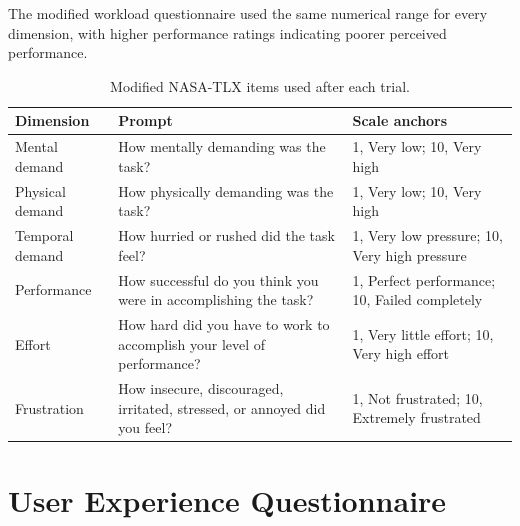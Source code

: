 \documentclass[
english,                 %
bibtex,                  %
includeExtraAbstracts, %
]{kththesis}
\newenvironment{evidenceblock}{\par\addvspace{6pt}\noindent\begin{minipage}{\linewidth}}{\end{minipage}\par\addvspace{6pt}}
\numberwithin{listing}{chapter}
\begin{document}
\begingroup
\scriptsize
\begin{evidenceblock}
\normalsize
The modified workload questionnaire used the same numerical range for every dimension, with higher performance ratings indicating poorer perceived performance.

\begin{table}[H]
\centering
\scriptsize
\caption[Modified NASA-TLX items]{Modified NASA-TLX items used after each trial.}\label{tab:app-nasa-items}
\begin{tabularx}{\linewidth}{L{0.20\textwidth}L{0.45\textwidth}L{0.25\textwidth}}
\toprule
Dimension & Prompt & Scale anchors \\ \midrule

Mental demand & How mentally demanding was the task? & 1, Very low; 10, Very high \\
Physical demand & How physically demanding was the task? & 1, Very low; 10, Very high \\
Temporal demand & How hurried or rushed did the task feel? & 1, Very low pressure; 10, Very high pressure \\
Performance & How successful do you think you were in accomplishing the task? & 1, Perfect performance; 10, Failed completely \\
Effort & How hard did you have to work to accomplish your level of performance? & 1, Very little effort; 10, Very high effort \\
Frustration & How insecure, discouraged, irritated, stressed, or annoyed did you feel? & 1, Not frustrated; 10, Extremely frustrated \\
\bottomrule
\end{tabularx}
\end{table}
\end{evidenceblock}
\endgroup

\section{User Experience Questionnaire}
\end{document}
